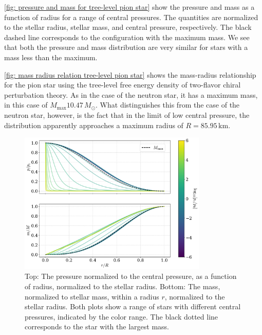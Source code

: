 \autoref{fig: pressure and mass for tree-level pion star} show the pressure and mass as a function of radius for a range of central pressures.
The quantities are normalized to the stellar radius, stellar mass, and central pressure, respectively.
The black dashed line corresponds to the configuration with the maximum mass.
We see that both the pressure and mass distribution are very similar for stars with a mass less than the maximum.

\autoref{fig: mass radius relation tree-level pion star} shows the mass-radius relationship for the pion star using the tree-level free energy density of two-flavor chiral perturbation theory.
As in the case of the neutron star, it has a maximum mass, in this case of $M_\text{max} 10.47\, M_\odot$.
What distinguishes this from the case of the neutron star, however, is the fact that in the limit of low central pressure, the distribution apparently approaches a maximum radius of $R = 85.95 \, \text{km}$.



\begin{figure}[h]
    \centering
    \includegraphics[width=0.8\textwidth]{../scripts/figurer/pressure_mass_pion_star.pdf}
    \caption{
        Top: The pressure normalized to the central pressure, as a function of radius, normalized to the stellar radius.
    Bottom: The mass, normalized to stellar mass, within a radius $r$, normalized to the stellar radius.
    Both plots show a range of stars with different central pressures, indicated by the color range.
    The black dotted line corresponds to the star with the largest mass.}
    \label{fig: pressure and mass for tree-level pion star}
\end{figure}


